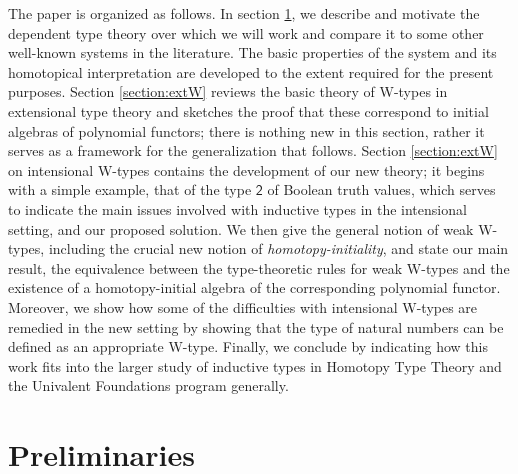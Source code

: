\documentclass{article}
\newcommand{\Bool}{\mathsf{2}}
\theoremstyle{remark}
\theoremstyle{definition}
\begin{document}
The paper is organized as follows.  In section \ref{section:prelims}, we describe and motivate the dependent type theory over which we will work and compare it to some other well-known systems in the literature. The basic properties of the system and its homotopical interpretation are developed to the extent required for the present purposes. Section \ref{section:extW} reviews the basic theory of W-types in extensional type theory and sketches the proof that these correspond to initial algebras of polynomial functors; there is nothing new in this section, rather it serves as a framework for the generalization that follows.  Section \ref{section:extW} on intensional W-types contains the development of our new theory; it begins with a simple example, that of the type $\Bool$ of Boolean truth values, which serves to indicate the main issues involved with inductive types in the intensional setting, and our proposed solution.  We then give the general notion of weak W-types, including the crucial new notion of \emph{homotopy-initiality}, and state our main result, the equivalence between the type-theoretic rules for weak W-types and the existence of a homotopy-initial algebra of the corresponding polynomial functor.  
Moreover, we show how some of the difficulties with intensional W-types are remedied in the new setting by showing that the type of natural numbers can be defined as an appropriate W-type.
Finally, we conclude by indicating how this work fits into the larger study of inductive types in Homotopy Type Theory and the Univalent Foundations program generally.

\section{Preliminaries}\label{section:prelims}
\end{document}
